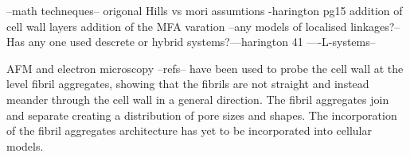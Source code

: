 --math techneques--
origonal Hills vs mori assumtions -harington pg15 
addition of cell wall layers
addition of the MFA varation
--any models of localised linkages?--
Has any one used descrete or hybrid systems?---harington 41
----L-systems--

AFM and electron microscopy --refs-- have been used to probe the cell wall at the level fibril aggregates, showing that the fibrils are not straight and instead meander through the cell wall in a general direction. The fibril aggregates join and separate creating a distribution of pore sizes and shapes. The incorporation of the fibril aggregates architecture has yet to be incorporated into cellular models. 